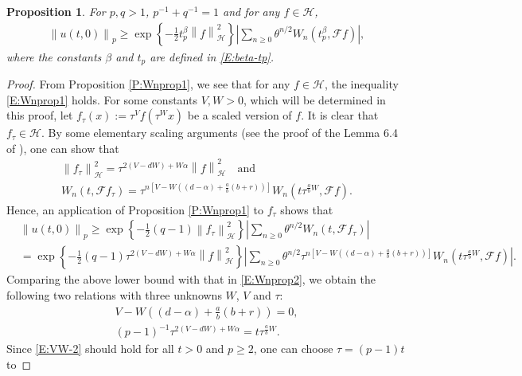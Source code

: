 \documentclass[12pt]{report}
\theoremstyle{plain}
\newtheorem{proposition}[theorem]{Proposition}
\theoremstyle{definition}
\numberwithin{equation}{section}
\newcommand{\Norm}[1]{\left\|  #1   \right\|}
\begin{document}
\begin{proposition} \label{P:Wnprop2}
	For $p,q > 1$, $p^{-1}+q^{-1}=1$ and for any $f \in \mathcal{H}$,
	\begin{align} \label{E:Wnprop2}
	\Norm{u(t,0)}_p \ge \exp\left\{ -\frac{1}{2} t_p^\beta \Norm{f}_{\mathcal{H}}^2 \right\}\left| \sum_{n \ge 0} \theta^{n/2} W_n\left(t_p^\beta, \mathcal{F}f\right) \right|,
	\end{align}
	where the constants $\beta$ and $t_p$ are defined in \eqref{E:beta-tp}.
\end{proposition}
\begin{proof}
	From Proposition \ref{P:Wnprop1}, we see that for any $f\in \mathcal{H}$, the inequality
	\eqref{E:Wnprop1} holds. For some constants $V,W>0$, which will be determined in this proof, let
	$f_\tau(x):=\tau^V f(\tau^W x)$ be a scaled version of $f$. It is clear that $f_\tau\in
	\mathcal{H}$. By some elementary scaling arguments (see the proof of the Lemma 6.4 of
	\cite{balan.chen.ea:22:exact}), one can show that
	\begin{gather}
	\Norm{f_\tau}_{\mathcal{H}}^2 = \tau^{2(V-dW)+W\alpha} \Norm{f}_\mathcal{H}^2 \quad \text{and}\\
	W_n \left(t,\mathcal{F}f_\tau\right) = \tau^{n\left[ V-W\left( (d-\alpha)+ \frac{a}{b}(b+r)
		\right) \right]}W_n\left(t\tau^{\frac{a}{b}W}, \mathcal{F}f\right).
	\end{gather}
	Hence, an application of Proposition \ref{P:Wnprop1} to $f_\tau$ shows that
	\begin{align*}
	& \Norm{u(t,0)}_p  \ge \exp\left\{ -\frac{1}{2}(q-1)\Norm{f_\tau}_{\mathcal{H}}^2 \right\} \left| \sum_{n \ge 0} \theta^{n/2} W_n(t,\mathcal{F}f_\tau) \right| \\
	& =\exp\left\{ -\frac{1}{2}(q-1)\tau^{2(V-dW)+W\alpha} \Norm{f}_\mathcal{H}^2 \right\} \left| \sum_{n \ge 0} \theta^{n/2} \tau^{n\left[ V-W\left( (d-\alpha)+ \frac{a}{b}(b+r) \right) \right]}W_n\left(t\tau^{\frac{a}{b}W}, \mathcal{F}f\right) \right|.
	\end{align*}
	Comparing the above lower bound with that in \eqref{E:Wnprop2}, we obtain the following two
	relations with three unknowns $W$, $V$ and $\tau$:
	\begin{gather} \label{E:VW-1}
	V-W\left( (d-\alpha)+ \frac{a}{b}(b+r) \right) = 0, \\
	(p-1)^{-1}\tau^{2(V-dW)+W\alpha} = t\tau^{\frac{a}{b}W}. \label{E:VW-2}
	\end{gather}
	Since \eqref{E:VW-2} should hold for all $t>0$ and $p\ge 2$, one can choose $\tau = (p-1)t$ to

\end{proof}
\end{document}
